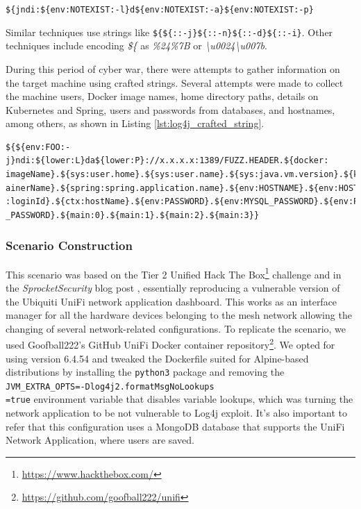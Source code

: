 \texttt{\$\{jndi:\$\{env:NOTEXIST:-l\}d\$\{env:NOTEXIST:-a\}\$\{env:NOTEXIST:-p\}}


Similar techniques use strings like \texttt{\$\{\$\{::-j\}\$\{::-n\}\$\{::-d\}\$\{::-i\}}. Other techniques include encoding \textit{\$\{} as \textit{\%24\%7B} or \textit{\textbackslash u0024\textbackslash u007b}.

During this period of cyber war, there were attempts to gather information on the target machine using crafted strings. Several attempts were made to collect the machine users, Docker image names, home directory paths, details on Kubernetes and Spring, users and passwords from databases, and hostnames, among others, as shown in Listing \ref{lst:log4j_crafted_string}.

\clearpage

\begin{lstlisting}[caption=Log4j Crafted String.,numbers=none,label={lst:log4j_crafted_string}]
${${env:FOO:-j}ndi:${lower:L}da${lower:P}://x.x.x.x:1389/FUZZ.HEADER.${docker:
imageName}.${sys:user.home}.${sys:user.name}.${sys:java.vm.version}.${k8s:cont
ainerName}.${spring:spring.application.name}.${env:HOSTNAME}.${env:HOST}.${ctx
:loginId}.${ctx:hostName}.${env:PASSWORD}.${env:MYSQL_PASSWORD}.${env:POSTGRES
_PASSWORD}.${main:0}.${main:1}.${main:2}.${main:3}}
\end{lstlisting}

\subsubsection{Scenario Construction} \label{sec:validation_log4j_scenario_construction}

This scenario was based on the Tier 2 Unified Hack The Box\footnote{\url{https://www.hackthebox.com/}} challenge and in the \textit{SprocketSecurity} blog post \cite{sprocketsecurity_ref}, essentially reproducing a vulnerable version of the Ubiquiti UniFi network application dashboard. This works as an interface manager for all the hardware devices belonging to the mesh network allowing the changing of several network-related configurations. To replicate the scenario, we used Goofball222's GitHub UniFi Docker container repository\footnote{\url{https://github.com/goofball222/unifi}}. We opted for using version 6.4.54 and tweaked the Dockerfile suited for Alpine-based distributions by installing the \texttt{python3} package
and removing the \texttt{JVM\_EXTRA\_OPTS=-Dlog4j2.formatMsgNoLookups\\=true} environment variable that disables variable lookups, which was turning the network application to be not vulnerable to Log4j exploit. It's also important to refer that this configuration uses a MongoDB database that supports the UniFi Network Application, where users are saved.

